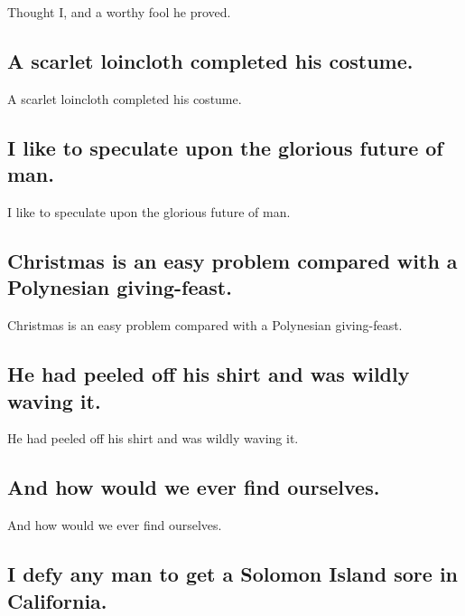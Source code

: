 \documentclass[]{article}
\begin{document}
Thought I, and a worthy fool he proved.

\hypertarget{a-scarlet-loincloth-completed-his-costume.}{%
\subsection{A scarlet loincloth completed his
costume.}\label{a-scarlet-loincloth-completed-his-costume.}}

A scarlet loincloth completed his costume.

\hypertarget{i-like-to-speculate-upon-the-glorious-future-of-man.}{%
\subsection{I like to speculate upon the glorious future of
man.}\label{i-like-to-speculate-upon-the-glorious-future-of-man.}}

I like to speculate upon the glorious future of man.

\hypertarget{christmas-is-an-easy-problem-compared-with-a-polynesian-giving-feast.}{%
\subsection{Christmas is an easy problem compared with a Polynesian
giving-feast.}\label{christmas-is-an-easy-problem-compared-with-a-polynesian-giving-feast.}}

Christmas is an easy problem compared with a Polynesian giving-feast.

\hypertarget{he-had-peeled-off-his-shirt-and-was-wildly-waving-it.}{%
\subsection{He had peeled off his shirt and was wildly waving
it.}\label{he-had-peeled-off-his-shirt-and-was-wildly-waving-it.}}

He had peeled off his shirt and was wildly waving it.

\hypertarget{and-how-would-we-ever-find-ourselves.}{%
\subsection{And how would we ever find
ourselves.}\label{and-how-would-we-ever-find-ourselves.}}

And how would we ever find ourselves.

\hypertarget{i-defy-any-man-to-get-a-solomon-island-sore-in-california.}{%
\subsection{I defy any man to get a Solomon Island sore in
California.}\label{i-defy-any-man-to-get-a-solomon-island-sore-in-california.}}
\end{document}
